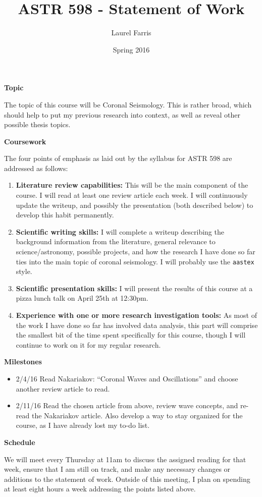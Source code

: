 \documentclass[12pt]{article}
\title{ASTR 598 - Statement of Work}
\date{Spring 2016}
\author{Laurel Farris}
\begin{document}
\maketitle

\large\textbf{Topic}\normalsize

The topic of this course will be Coronal Seismology. This is
rather broad, which should help to put my previous research into context,
as well as reveal other possible thesis topics.

\large\textbf{Coursework}\normalsize

The four points of emphasis as laid out by the syllabus for ASTR
598 are addressed as follows:
\begin{enumerate}
    \item \textbf{Literature review capabilities:} This will be the main
        component of the course. I will read at least one review article
        each week. I will continuously update the writeup, and
        possibly the presentation (both described below)
        to develop this habit permanently.
    \item \textbf{Scientific writing skills:} I will complete a
        writeup describing the
        background information from the literature, general
        relevance to science/astronomy, possible projects, and how the
        research I have done so far ties into the main topic of coronal
        seismology. I will probably use the \texttt{aastex} style.
    \item \textbf{Scientific presentation skills:} I will present the results
        of this course at a pizza lunch talk on April 25th at 12:30pm.
    \item \textbf{Experience with one or more research investigation tools:}
        As most of the work I have done so far has involved data analysis, this
        part will comprise the smallest bit of the time spent specifically for
        this course, though I will continue to work on it for my regular
        research.
\end{enumerate}

\large\textbf{Milestones}\normalsize

\begin{itemize}
    \item 2/4/16 Read Nakariakov: ``Coronal Waves and Oscillations'' and
        choose another review article to read.
    \item 2/11/16 Read the chosen article from above, review wave concepts,
        and re-read the Nakariakov article. Also develop a way to stay
        organized for the course, as I have already lost my to-do list.
\end{itemize}

\large\textbf{Schedule}\normalsize

We will meet every Thursday at 11am to discuss the assigned reading
for that week, ensure that I am still on track, and make any necessary
changes or additions to the statement of work.
Outside of this meeting, I plan on spending at least eight
hours a week addressing the points listed above.
\end{document}
